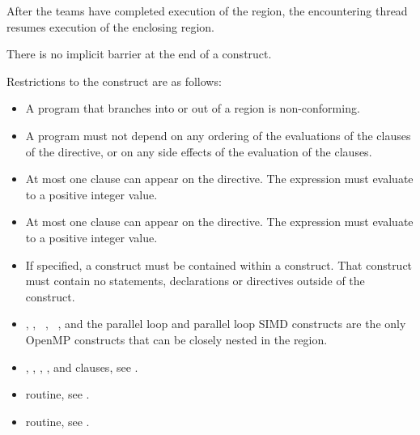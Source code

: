 After the teams have completed execution of the  region, the encountering thread 
resumes execution of the enclosing  region.

There is no implicit barrier at the end of a  construct.

\restrictions
Restrictions to the  construct are as follows:

\begin{itemize}
\item A program that branches into or out of a  region is non-conforming.

\item A program must not depend on any ordering of the evaluations of the clauses of the 
 directive, or on any side effects of the evaluation of the clauses.

\item At most one  clause can appear on the directive. The 
 expression must evaluate to a positive integer value.

\item At most one  clause can appear on the directive. The 
expression must evaluate to a positive integer value.

\item If specified, a  construct must be contained within a  construct. That  construct must contain no statements, declarations or directives outside of the  construct.

\item {}, , ~, ~, 
and the parallel loop and parallel loop SIMD constructs are the only OpenMP 
constructs that can be closely nested in the  region. 
\end{itemize}

\crossreferences
\begin{itemize}

\item {}, , , , and  clauses, see 
.

\item {} routine, see 
.

\item {} routine, see 
.
\end{itemize}









